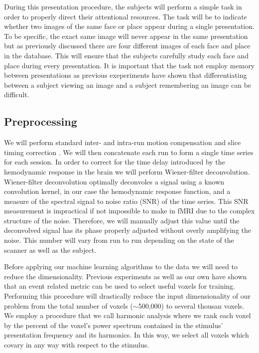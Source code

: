 \documentclass[12pt]{article}
\begin{document}
During this presentation procedure, the subjects will perform a simple task in order to properly direct their attentional resources.
The task will be to indicate whether two images of the same face or place appear during a single presentation.
To be specific, the exact same image will never appear in the same presentation but as previously discussed there are four different images of each face and place in the database.
This will ensure that the subjects carefully study each face and place during every presentation.
It is important that the task not employ memory between presentations as previous exeperiments \cite{Lewis-Peacock2012} have shown that differentiating between a subject viewing an image and a subject remembering an image can be difficult.

\subsection{Preprocessing}
We will perform standard inter- and intra-run motion compensation and slice timing correction \cite{Nestares2000}.
We will then concatenate each run to form a single time series for each session.
In order to correct for the time delay introduced by the hemodynamic response in the brain we will perform Wiener-filter deconvolution.
Wiener-filter deconvolution optimally deconvoles a signal using a known convolution kernel, in our case the hemodynamic response function, and a measure of the spectral signal to noise ratio (SNR) of the time series.
This SNR measurement is impractical if not impossible to make in fMRI due to the complex structure of the noise.
Therefore, we will manually adjust this value until the deconvolved signal has its phase properly adjusted without overly amplifying the noise.
This number will vary from run to run depending on the state of the scanner as well as the subject.

Before applying our machine learning algorithms to the data we will need to reduce the dimensionality.
Previous experiments \cite{Pereira2009} as well as our own have shown that an event related metric can be used to select useful voxels for training.
Performing this procedure will drastically reduce the input dimensionality of our problem from the total number of voxels ($\sim$500,000) to several thousan voxels.
We employ a procedure that we call harmonic analysis where we rank each voxel by the percent of the voxel's power spectrum contained in the stimulus' presentation frequency and its harmonics.
In this way, we select all voxels which covary in any way with respect to the stimulus.
\end{document}
